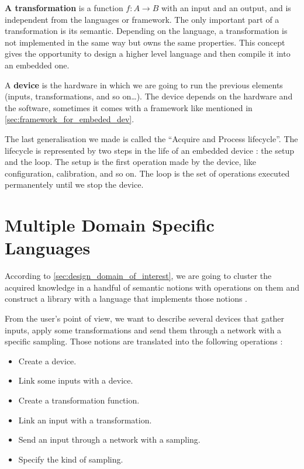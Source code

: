 \textbf{A transformation} is a function $f : A \rightarrow B$ with an input
and an output, and is independent from the languages or framework.
The only important part of a transformation is its semantic. Depending on the
language, a transformation is not implemented in the same way but owns the same
properties. This concept gives the opportunity to design a higher level
language and then compile it into an embedded one.

A \textbf{device} is the hardware in which we are going to run the previous elements
(inputs, transformations, and so on…). The device depends on the hardware and
the software, sometimes it comes with a framework like mentioned
in \ref{sec:framework_for_embeded_dev}.

The last generalisation we made is called the ``Acquire and Process lifecycle''.
The lifecycle is represented by two steps in the life of an embedded device : the
setup and the loop. The setup is the first operation made by the device, like
configuration, calibration, and so on. The loop is the set of operations
executed permanentely until we stop the device.

\section{Multiple Domain Specific Languages}
\label{sec:multiple_dsl}

According to \ref{sec:design_domain_of_interest}, we are going to cluster the acquired
knowledge in a handful of semantic notions with operations on them and construct
a library with a language that implements those notions
\cite{little_languages_little_maintenance}.

From the user's point of view, we want to describe several devices that gather
inputs, apply some transformations and send them through a network with a
specific sampling. Those notions are translated into the following operations :

\begin{itemize}
\item Create a device.
\item Link some inputs with a device.
\item Create a transformation function.
\item Link an input with a transformation.
\item Send an input through a network with a sampling.
\item Specify the kind of sampling.
\end{itemize}

